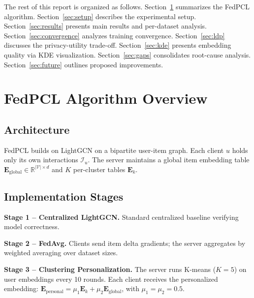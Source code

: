 \documentclass[10pt,twocolumn]{article}
\begin{document}
The rest of this report is organized as follows.
Section~\ref{sec:method} summarizes the FedPCL algorithm.
Section~\ref{sec:setup} describes the experimental setup.
Section~\ref{sec:results} presents main results and per-dataset analysis.
Section~\ref{sec:convergence} analyzes training convergence.
Section~\ref{sec:ldp} discusses the privacy-utility trade-off.
Section~\ref{sec:kde} presents embedding quality via KDE visualization.
Section~\ref{sec:gaps} consolidates root-cause analysis.
Section~\ref{sec:future} outlines proposed improvements.

\section{FedPCL Algorithm Overview}
\label{sec:method}

\subsection{Architecture}

FedPCL builds on LightGCN \cite{lightgcn2020} on a bipartite user-item
graph. Each client $u$ holds only its own interactions $\mathcal{I}_u$.
The server maintains a global item embedding table
$\mathbf{E}_{\mathrm{global}} \in \mathbb{R}^{|\mathcal{V}| \times d}$
and $K$ per-cluster tables $\mathbf{E}_k$.

\subsection{Implementation Stages}

\noindent\textbf{Stage 1 -- Centralized LightGCN.}
Standard centralized baseline verifying model correctness.

\noindent\textbf{Stage 2 -- FedAvg.}
Clients send item delta gradients; the server aggregates by weighted
averaging over dataset sizes.

\noindent\textbf{Stage 3 -- Clustering Personalization.}
The server runs K-means ($K{=}5$) on user embeddings every 10 rounds.
Each client receives the personalized embedding:
$\mathbf{E}_{\mathrm{personal}} = \mu_1 \mathbf{E}_k
+ \mu_2 \mathbf{E}_{\mathrm{global}}$, with $\mu_1 = \mu_2 = 0.5$.
\end{document}
